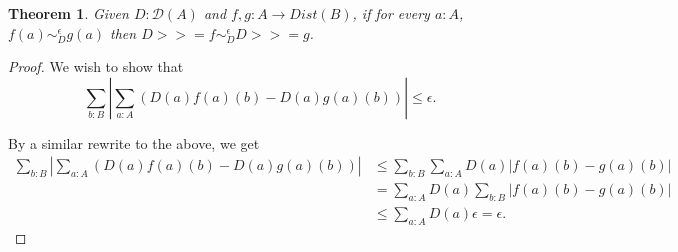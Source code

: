 \documentclass{article}
\newtheorem{theorem}{Theorem}
\theoremstyle{definition}
\newcommand{\bind}{\mathbin{>\!\!>\!=}}
\newcommand{\distsim}[1]{\mathbin{\sim_D^{#1}}}
\newcommand{\disteps}{\distsim{\epsilon}}
\newcommand{\Dist}{\mathcal{D}}
\begin{document}
    \begin{theorem}
        Given $D : \Dist(A)$ and $f, g : A \to Dist(B)$, if for every $a : A$, $f(a) \disteps g(a)$ then $D \bind f
        \disteps D \bind g$.
    \end{theorem}

    \begin{proof}
        We wish to show that
        \[
            \sum_{b : B} \left| \sum_{a : A} \left(D(a)f(a)(b) - D(a)g(a)(b) \right) \right| \le \epsilon.
        \]

        By a similar rewrite to the above, we get
        \begin{align*}
            \sum_{b : B} \left| \sum_{a : A} \left(D(a)f(a)(b) - D(a)g(a)(b) \right) \right|
            &\le \sum_{b : B} \sum_{a : A} D(a) \left|f(a)(b) - g(a)(b) \right|\\
            &= \sum_{a : A}D(a) \sum_{b : B} \left|f(a)(b) - g(a)(b) \right|\\
            &\le \sum_{a : A}D(a)\epsilon = \epsilon.
        \end{align*}
    \end{proof}
\end{document}
